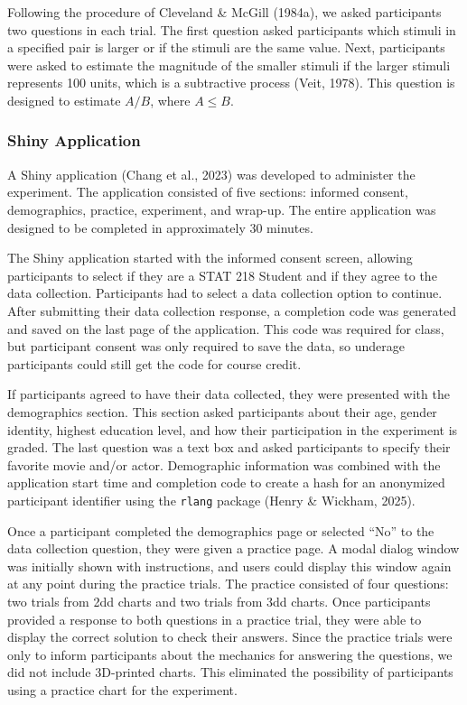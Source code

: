 \documentclass[phd]{nuthesis}
\begin{document}
Following the procedure of Cleveland \& McGill (1984a), we asked
participants two questions in each trial. The first question asked
participants which stimuli in a specified pair is larger or if the
stimuli are the same value. Next, participants were asked to estimate
the magnitude of the smaller stimuli if the larger stimuli represents
100 units, which is a subtractive process (Veit, 1978). This question is
designed to estimate \(A/B\), where \(A\leq B\).

\subsubsection{Shiny Application}\label{shiny-application}

A Shiny application (Chang et al., 2023) was developed to administer the
experiment. The application consisted of five sections: informed
consent, demographics, practice, experiment, and wrap-up. The entire
application was designed to be completed in approximately 30 minutes.

The Shiny application started with the informed consent screen, allowing
participants to select if they are a STAT 218 Student and if they agree
to the data collection. Participants had to select a data collection
option to continue. After submitting their data collection response, a
completion code was generated and saved on the last page of the
application. This code was required for class, but participant consent
was only required to save the data, so underage participants could still
get the code for course credit.

If participants agreed to have their data collected, they were presented
with the demographics section. This section asked participants about
their age, gender identity, highest education level, and how their
participation in the experiment is graded. The last question was a text
box and asked participants to specify their favorite movie and/or actor.
Demographic information was combined with the application start time and
completion code to create a hash for an anonymized participant
identifier using the \texttt{rlang} package (Henry \& Wickham, 2025).

Once a participant completed the demographics page or selected ``No'' to
the data collection question, they were given a practice page. A modal
dialog window was initially shown with instructions, and users could
display this window again at any point during the practice trials. The
practice consisted of four questions: two trials from 2dd charts and two
trials from 3dd charts. Once participants provided a response to both
questions in a practice trial, they were able to display the correct
solution to check their answers. Since the practice trials were only to
inform participants about the mechanics for answering the questions, we
did not include 3D-printed charts. This eliminated the possibility of
participants using a practice chart for the experiment.
\end{document}
